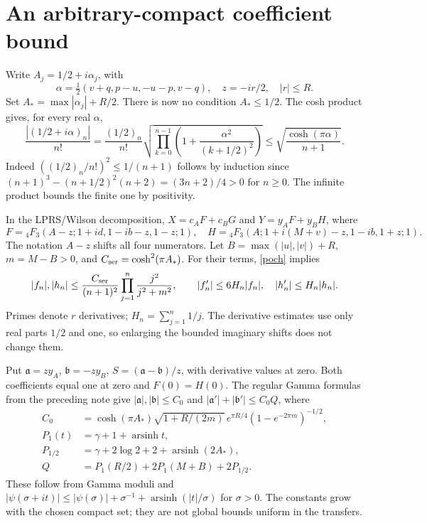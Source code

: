 \documentclass[11pt,a4paper]{article}
\newcommand{\ga}{\mathfrak a}\newcommand{\gb}{\mathfrak b}
\begin{document}
\newpage
\section{An arbitrary-compact coefficient bound}
Write $A_j=1/2+i\alpha_j$, with
\[
 \alpha=\tfrac12(v+q,p-u,-u-p,v-q),\quad z=-ir/2,\quad |r|\le R.
\]
Set $A_*=\max|\alpha_j|+R/2$. There is now no condition $A_*\le1/2$.
The cosh product \cite{products} gives, for every real $\alpha$,
\begin{equation}
 \frac{|(1/2+i\alpha)_n|}{n!}
 =\frac{(1/2)_n}{n!}
 \sqrt{\prod_{k=0}^{n-1}\left(1+\frac{\alpha^2}{(k+1/2)^2}\right)}
 \le\sqrt{\frac{\cosh(\pi\alpha)}{n+1}}.
 \label{poch}
\end{equation}
Indeed $((1/2)_n/n!)^2\le1/(n+1)$ follows by induction since
$(n+1)^3-(n+1/2)^2(n+2)=(3n+2)/4>0$ for $n\ge0$.
The infinite product bounds the finite one by positivity.

In the LPRS/Wilson decomposition, $X=c_AF+c_BG$ and
$Y=y_AF+y_BH$, where
\[
 F={}_4F_3(A-z;1+id,1-ib-z,1-z;1),\quad
 H={}_4F_3(A;1+i(M+v)-z,1-ib,1+z;1).
\]
The notation $A-z$ shifts all four numerators.
Let $B=\max(|u|,|v|)+R$, $m=M-B>0$, and $C_{\rm ser}=\cosh^2(\pi A_*)$.
For their terms, \eqref{poch} implies
\[
 |f_n|,|h_n|\le\frac{C_{\rm ser}}{(n+1)^2}
       \prod_{j=1}^n\frac{j^2}{j^2+m^2},\qquad
 |f_n'|\le6H_n|f_n|,\quad |h_n'|\le H_n|h_n|.
\]
Primes denote $r$ derivatives; $H_n=\sum_{j=1}^n1/j$.
The derivative estimates use only real parts $1/2$ and one, so
enlarging the bounded imaginary shifts does not change them.

Put $\ga=zy_A$, $\gb=-zy_B$, $S=(\ga-\gb)/z$, with derivative
values at zero. Both coefficients equal one at zero and $F(0)=H(0)$.
The regular Gamma formulas from the preceding note give
$|\ga|,|\gb|\le C_0$ and $|\ga'|+|\gb'|\le C_0Q$, where
\begin{align*}
 C_0&=\cosh(\pi A_*)\sqrt{1+R/(2m)}\,
          e^{\pi R/4}(1-e^{-2\pi m})^{-1/2},\\
 P_1(t)&=\gamma+1+\operatorname{arsinh}t,\\
 P_{1/2}&=\gamma+2\log2+2+\operatorname{arsinh}(2A_*),\\
 Q&=P_1(R/2)+2P_1(M+B)+2P_{1/2}.
\end{align*}
These follow from Gamma moduli and
$|\psi(\sigma+it)|\le|\psi(\sigma)|+\sigma^{-1}
+\operatorname{arsinh}(|t|/\sigma)$ for $\sigma>0$.
The constants grow with the chosen compact set; they are not global
bounds uniform in the transfers.

\newpage
\end{document}
